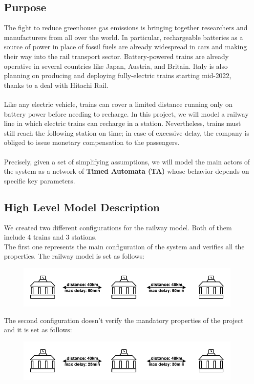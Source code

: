 \subsection{Purpose}
The fight to reduce greenhouse gas emissions is bringing together researchers and manufacturers from all over the world.
In particular, rechargeable batteries as a source of power in place of fossil fuels are already widespread in cars and
making their way into the rail transport sector. Battery-powered trains are already operative in several countries like
Japan, Austria, and Britain. Italy is also planning on producing and deploying fully-electric trains starting mid-2022,
thanks to a deal with Hitachi Rail.\\
\\ Like any electric vehicle, trains can cover a limited distance running only on battery power before needing to recharge.
In this project, we will model a railway line in which electric trains can recharge in a station. Nevertheless,
trains must still reach the following station on time; in case of excessive delay, the company is obliged to issue
monetary compensation to the passengers.\\
\\ Precisely, given a set of simplifying assumptions, we will model the main actors of the system as a network of \textbf{Timed Automata (TA)}
whose behavior depends on specific key parameters.


\bigskip
\subsection{High Level Model Description}
We created two different configurations for the railway model. Both of them include 4 trains and 3 stations.\\
The first one represents the main configuration of the system and verifies all the properties. The railway model is set as follows:
\\
\begin{figure}[H]
    \centering
    \includegraphics[scale=0.4]{images/poweredRailway.png}
\end{figure}
\bigskip

The second configuration doesn't verify the mandatory properties of the project and it is set as follows:
\\
\begin{figure}[H]
    \centering
    \includegraphics[scale=0.4]{images/poweredRailwaySimple.png}
\end{figure}
\bigskip

